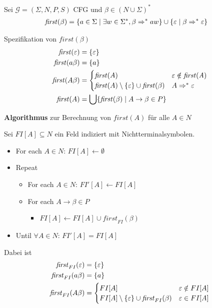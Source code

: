 {\begin{Def}
  Sei $\mathcal{G} = (\Sigma, N, P, S)$ \ac{CFG} und $\beta \in
  (N\cup\Sigma)^*$
  \begin{align*}
    \mathit{first} (\beta) &= \{ a \in \Sigma \mid \exists w\in
    \Sigma^* , \beta \=>^* aw \} \cup \{\Eps \mid \beta \=>^* \Eps \}
  \end{align*}
\end{Def}

Spezifikation von $\mathit{first}(\beta)$
\begin{align*}
  \mathit{first} (\Eps) & = \{ \Eps \} \\
  \mathit{first} (a\beta) & = \{ a \} \\
  \mathit{first} (A\beta) & =
  \begin{cases}
    \mathit{first} (A) & \Eps \notin \mathit{first (A)} \\
    \mathit{first} (A) \setminus \{\Eps\} \cup \mathit{first} (\beta)
    & A\=>^* \Eps
  \end{cases} \\
  \mathit{first} (A) &= \bigcup  \{ \mathit{first} (\beta) \mid A \to
  \beta \in P \}
\end{align*}

\textbf{Algorithmus} zur Berechnung von $\mathit{first} (A)$ für alle $A\in N$

Sei $FI[A] \subseteq N$ ein Feld indiziert mit Nichtterminalsymbolen.

\begin{itemize}
\item[] For each $A \in N$: $FI[A] \gets \emptyset$
\item[] Repeat
  \begin{itemize}
  \item[] For each $A\in N$: $FI'[A] \gets FI[A]$
  \item[] For each $A \to \beta \in P$
    \begin{itemize}
    \item[] $FI[A] \gets FI[A] \cup \mathit{first}_{FI} (\beta)$
    \end{itemize}
  \end{itemize}
\item[] Until $\forall A\in N$: $FI'[A] = FI[A]$
\end{itemize}

Dabei ist
\begin{align*}
  \mathit{first}_{FI} (\varepsilon) & = \{ \varepsilon \} \\
  \mathit{first}_{FI} (a\beta) & = \{ a \} \\
  \mathit{first}_{FI} (A\beta) & =
  \begin{cases}
    FI[A] & \varepsilon \notin FI[A] \\
    FI[A] \setminus \{\varepsilon\} \cup \mathit{first}_{FI} (\beta)
    & \varepsilon\in FI[A]
  \end{cases} 
\end{align*}

}
